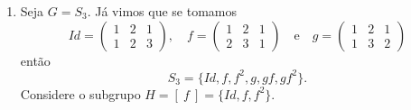 \documentclass{beamer}
\begin{document}
    \begin{frame}
        \begin{exemplos}
            \begin{enumerate}[label=({\arabic*})]
                \conti
                
                \item Seja $G = S_3$. Já vimos que se tomamos
                \[
                    Id = \begin{pmatrix}
                        1 & 2 & 1\\
                        1 & 2 & 3
                    \end{pmatrix},\quad
                    f = \begin{pmatrix}
                        1 & 2 & 1\\
                        2 & 3 & 1
                    \end{pmatrix} \quad \mbox{e}\quad
                    g = \begin{pmatrix}
                        1 & 2 & 1\\
                        1 & 3 & 2
                    \end{pmatrix}
                \]
                então
                \[
                    S_3 = \{Id, f, f^2, g, gf, gf^2\}.
                \]
                Considere o subgrupo $H = [\ f\ ] = \{Id, f, f^2\}$.

                \seti
            \end{enumerate}
        \end{exemplos}
    \end{frame}
    
\end{document}
